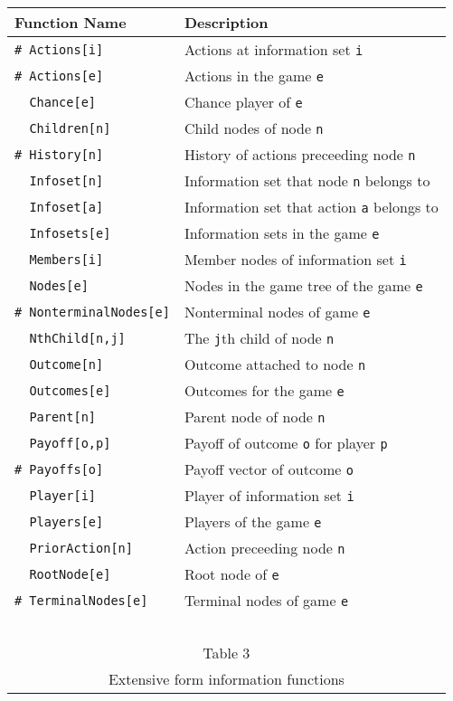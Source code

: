\begin{table}[htp]
\begin{center}
\begin{tabular} {|l||l|} \hline
Function Name	& Description \\ 
\hline
\verb+# Actions[i]+ & Actions at information set \verb+i+ \\
\verb+# Actions[e]+ & Actions in the game \verb+e+ \\
\verb+  Chance[e]+ & Chance player of \verb+e+ \\
\verb+  Children[n]+ & Child nodes of node \verb+n+ \\
\verb+# History[n]+ & History of actions preceeding node \verb+n+ \\
\verb+  Infoset[n]+ & Information set that node \verb+n+ belongs to\\
\verb+  Infoset[a]+ & Information set that action \verb+a+ belongs to\\
\verb+  Infosets[e]+ & Information sets in the game \verb+e+\\
\verb+  Members[i]+ & Member nodes of information set \verb+i+\\
\verb+  Nodes[e]+ & Nodes in the game tree of the game \verb+e+\\
\verb+# NonterminalNodes[e]+ & Nonterminal nodes of game \verb+e+\\
\verb+  NthChild[n,j]+ & The \verb+j+th child of node \verb+n+ \\
\verb+  Outcome[n]+ & Outcome attached to node \verb+n+ \\
\verb+  Outcomes[e]+ & Outcomes for the game \verb+e+ \\
\verb+  Parent[n]+ & Parent node of node \verb+n+ \\
\verb+  Payoff[o,p]+ & Payoff  of outcome \verb+o+ for player \verb+p+ \\
\verb+# Payoffs[o]+ & Payoff vector of outcome \verb+o+ \\
\verb+  Player[i]+ & Player of information set \verb+i+ \\
\verb+  Players[e]+ & Players of the game \verb+e+ \\
\verb+  PriorAction[n]+ & Action preceeding node \verb+n+ \\
\verb+  RootNode[e]+ & Root node of \verb+e+ \\
\verb+# TerminalNodes[e]+ & Terminal nodes of game \verb+e+\\
\hline
\multicolumn{2}{c}{\ }\\
\multicolumn{2}{c}{Table 3}\\
\multicolumn{2}{c}{Extensive form information functions}\\
\end{tabular}
\end{center}
\end{table}
\medskip

